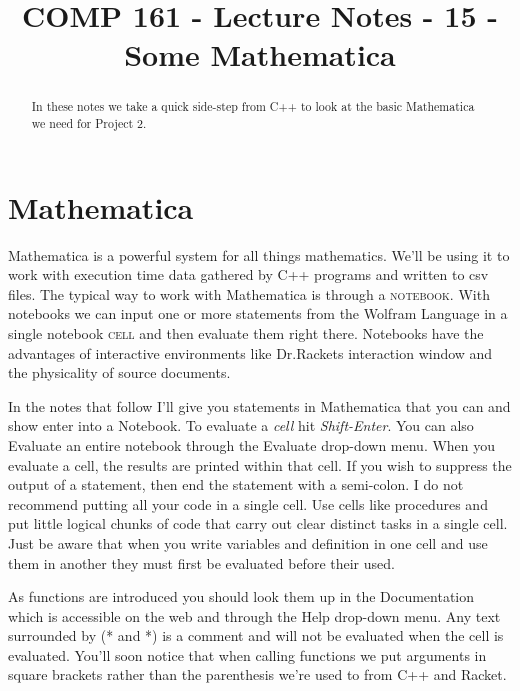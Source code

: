 \documentclass[]{tufte-handout}
\title{COMP 161 - Lecture Notes - 15 - Some Mathematica}
\date{}
\begin{document}
 
\maketitle

\begin{abstract}
In these notes we take a quick side-step from C++ to look at the basic Mathematica we need for Project 2.
\end{abstract}

\section{Mathematica}

Mathematica is a powerful system for all things mathematics. We'll be using it to work with execution time data gathered by C++ programs and written to csv files. The typical way to work with Mathematica is through a \textsc{notebook}. With notebooks we can input one or more statements from the Wolfram Language in a single notebook \textsc{cell} and then evaluate them right there. Notebooks have the advantages of interactive environments like Dr.Rackets interaction window and the physicality of source documents.  

In the notes that follow I'll give you statements in Mathematica that you can and show enter into a Notebook. To evaluate a \textit{cell} hit \textit{Shift-Enter}. You can also Evaluate an entire notebook through the Evaluate drop-down menu. When you evaluate a cell, the results are printed within that cell. If you wish to suppress the output of a statement, then end the statement with a semi-colon. I do not recommend putting all your code in a single cell. Use cells like procedures and put little logical chunks of code that carry out clear distinct tasks in a single cell. Just be aware  that when you write variables and definition in one cell and use them in another they must first be evaluated before their used. 

As functions are introduced you should look them up in the Documentation which is accessible on the web and through the Help drop-down menu. Any text surrounded by (* and *) is a comment and will not be evaluated when the cell is evaluated. You'll soon notice that when calling functions we put arguments in square brackets rather than the parenthesis we're used to from C++ and Racket.
\end{document}
